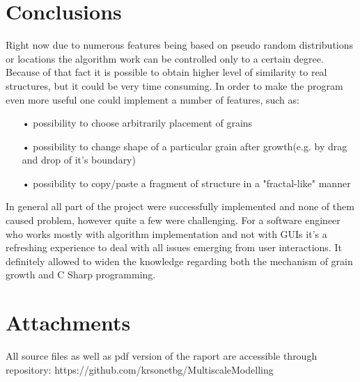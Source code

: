 \documentclass[a4paper, 11pt]{article}
\begin{document}
\section*{Conclusions}
Right now due to numerous features being based on pseudo random distributions or locations the algorithm work can be controlled only to a certain degree. Because of that fact it is possible to obtain higher level of similarity to real structures, but it could be very time consuming. In order to make the program even more useful one could implement a number of features, such as:
\begin{itemize}
\item[•] possibility to choose arbitrarily placement of grains
\item[•] possibility to change shape of a particular grain after growth(e.g. by drag and drop of it's boundary)
\item[•] possibility to copy/paste a fragment of structure in a "fractal-like" manner
\end{itemize}

In general all part of the project were successfully implemented and none of them caused problem, however quite a few were challenging. For a software engineer who works mostly with algorithm implementation and not with GUIs it's a refreshing experience to deal with all issues emerging from user interactions. It definitely allowed to widen the knowledge regarding both the mechanism of grain growth and C Sharp programming.
\section*{Attachments}
All source files as well as pdf version of the raport are accessible through repository:
https://github.com/krsonetbg/MultiscaleModelling
\end{document}
